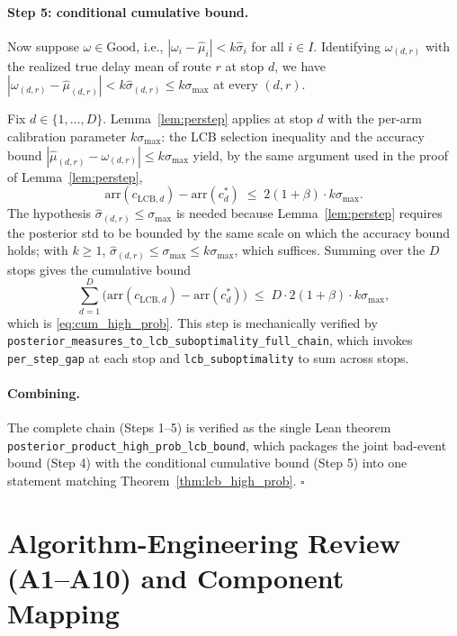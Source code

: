 \documentclass[11pt]{article}
\theoremstyle{definition}
\theoremstyle{remark}
\begin{document}
\paragraph{Step 5: conditional cumulative bound.}
Now suppose $\omega \in \mathrm{Good}$, i.e., $|\omega_i - \hat\mu_i|
< k\hat\sigma_i$ for all $i \in I$. Identifying $\omega_{(d,r)}$
with the realized true delay mean of route $r$ at stop $d$, we have
$|\omega_{(d,r)} - \hat\mu_{(d,r)}| < k\hat\sigma_{(d,r)}
\leq k\sigma_{\max}$ at every $(d,r)$.

Fix $d \in \{1,\ldots,D\}$. Lemma~\ref{lem:perstep} applies at stop
$d$ with the per-arm calibration parameter $k\sigma_{\max}$: the LCB
selection inequality and the accuracy bound
$|\hat\mu_{(d,r)} - \omega_{(d,r)}| \leq k\sigma_{\max}$ yield, by
the same argument used in the proof of Lemma~\ref{lem:perstep},
\[
\mathrm{arr}(c_{\mathrm{LCB},d}) - \mathrm{arr}(c^*_d)
\;\leq\; 2(1 + \beta) \cdot k\sigma_{\max}.
\]
The hypothesis $\hat\sigma_{(d,r)} \leq \sigma_{\max}$ is needed
because Lemma~\ref{lem:perstep} requires the posterior std to be
bounded by the same scale on which the accuracy bound holds; with
$k \geq 1$, $\hat\sigma_{(d,r)} \leq \sigma_{\max} \leq k\sigma_{\max}$,
which suffices. Summing over the $D$ stops gives the cumulative bound
\[
\sum_{d=1}^{D} \bigl(\mathrm{arr}(c_{\mathrm{LCB},d})
- \mathrm{arr}(c^*_d)\bigr)
\;\leq\; D \cdot 2(1+\beta) \cdot k\sigma_{\max},
\]
which is \eqref{eq:cum_high_prob}. This step is mechanically
verified by\linebreak
\texttt{posterior\_measures\_to\_lcb\_\allowbreak suboptimality\_\allowbreak full\_\allowbreak chain},
which invokes \texttt{per\_step\_gap} at each stop and
\texttt{lcb\_suboptimality} to sum across stops.

\paragraph{Combining.} The complete chain (Steps 1--5) is verified
as the single Lean theorem\linebreak
\texttt{posterior\_product\_\allowbreak high\_prob\_\allowbreak lcb\_\allowbreak bound}, which packages
the joint bad-event bound (Step 4) with the conditional cumulative
bound (Step 5) into one statement matching
Theorem~\ref{thm:lcb_high_prob}. \hfill$\square$

\section{Algorithm-Engineering Review (A1--A10) and Component Mapping}
\label{app:a1a10}
\end{document}

